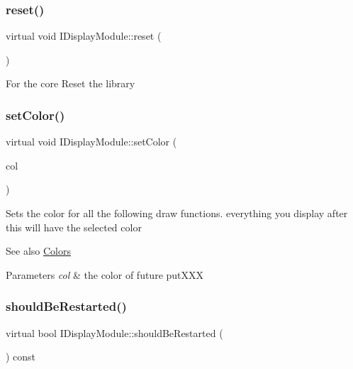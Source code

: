 \subsubsection{\texorpdfstring{reset()}{reset()}}
{\footnotesize\ttfamily virtual void I\+Display\+Module\+::reset (\begin{DoxyParamCaption}{ }\end{DoxyParamCaption})\hspace{0.3cm}{\ttfamily [pure virtual]}}

For the core Reset the library \mbox{\label{class_i_display_module_ad65106183d94d0019912b7c047ab0551}} 
\subsubsection{\texorpdfstring{set\+Color()}{setColor()}}
{\footnotesize\ttfamily virtual void I\+Display\+Module\+::set\+Color (\begin{DoxyParamCaption}\item[{\hyperlink{class_i_display_module_a1130023f28ca7d10e4a04ef9b698fcbb}{I\+Display\+Module\+::\+Colors}}]{col }\end{DoxyParamCaption})\hspace{0.3cm}{\ttfamily [pure virtual]}}

Sets the color for all the following draw functions. everything you display after this will have the selected color

\begin{DoxySeeAlso}{See also}
\hyperlink{class_i_display_module_a1130023f28ca7d10e4a04ef9b698fcbb}{Colors} 
\end{DoxySeeAlso}

\begin{DoxyParams}{Parameters}
{\em col} & the color of future put\+X\+XX \\
\hline
\end{DoxyParams}
\mbox{\label{class_i_display_module_ab3df0440b279e6e9ad631f43b61cb9ac}} 
\subsubsection{\texorpdfstring{should\+Be\+Restarted()}{shouldBeRestarted()}}
{\footnotesize\ttfamily virtual bool I\+Display\+Module\+::should\+Be\+Restarted (\begin{DoxyParamCaption}{ }\end{DoxyParamCaption}) const\hspace{0.3cm}{\ttfamily [pure virtual]}}


